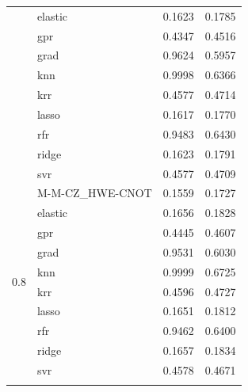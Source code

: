 \documentclass[journal=jacsat,manuscript=article]{achemso}
\begin{document}
\begin{longtable}{llrr}
& elastic & 0.1623 & 0.1785 \\
& gpr & 0.4347 & 0.4516 \\
& grad & 0.9624 & 0.5957 \\
& knn & 0.9998 & 0.6366 \\
& krr & 0.4577 & 0.4714 \\
& lasso & 0.1617 & 0.1770 \\
& rfr & 0.9483 & 0.6430 \\
& ridge & 0.1623 & 0.1791 \\
& svr & 0.4577 & 0.4709 \\
\cline{1-4}
\multirow[t]{10}{*}{0.8} & M-M-CZ{\_}HWE-CNOT & 0.1559 & 0.1727 \\
& elastic & 0.1656 & 0.1828 \\
& gpr & 0.4445 & 0.4607 \\
& grad & 0.9531 & 0.6030 \\
& knn & 0.9999 & 0.6725 \\
& krr & 0.4596 & 0.4727 \\
& lasso & 0.1651 & 0.1812 \\
& rfr & 0.9462 & 0.6400 \\
& ridge & 0.1657 & 0.1834 \\
& svr & 0.4578 & 0.4671 \\
\cline{1-4}
\bottomrule
\label{table:5BSE49_LC}
\end{longtable}
\end{document}
